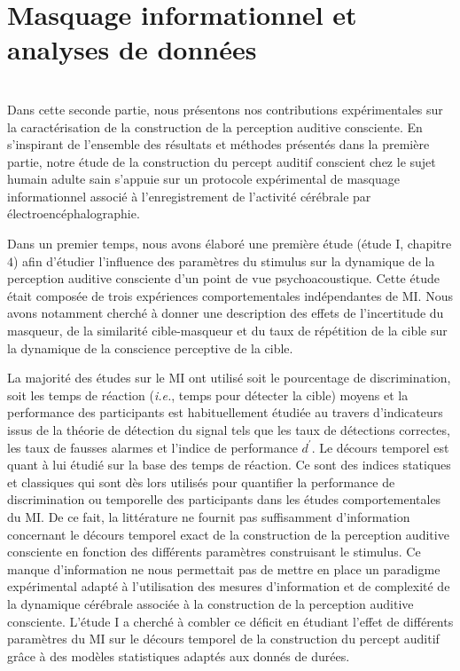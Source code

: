 \chapter{Masquage informationnel et analyses de données}
\label{chapitre3}
\noindent \hrulefill \\

Dans cette seconde partie, nous présentons nos contributions expérimentales sur la caractérisation de la construction de la perception auditive consciente. 
En s'inspirant de l'ensemble des résultats et méthodes présentés dans la première partie, notre étude de la construction du percept auditif conscient chez le sujet humain adulte sain s'appuie sur un protocole expérimental de masquage informationnel associé à l'enregistrement de l'activité cérébrale par électroencéphalographie. 

Dans un premier temps, nous avons élaboré une première étude (étude I, chapitre $4$) afin d'étudier l'influence des paramètres du stimulus sur la dynamique de la perception auditive consciente d'un point de vue psychoacoustique. 
Cette étude était composée de trois expériences comportementales indépendantes de MI. 
Nous avons notamment cherché à donner une description des effets de l'incertitude du masqueur, de la similarité cible-masqueur et du taux de répétition de la cible sur la dynamique de la conscience perceptive de la cible.

La majorité des études sur le MI ont utilisé soit le pourcentage de discrimination, soit les temps de réaction (\textit{i.e.}, temps pour détecter la cible) moyens et la performance des participants est habituellement étudiée au travers d'indicateurs issus de la théorie de détection du signal tels que les taux de détections correctes, les taux de fausses alarmes et l'indice de performance $d^\prime$. 
Le décours temporel est quant à lui étudié sur la base des temps de réaction. 
Ce sont des indices statiques et classiques qui sont dès lors utilisés pour quantifier la performance de discrimination ou temporelle des participants dans les études comportementales du MI. 
De ce fait, la littérature ne fournit pas suffisamment d'information concernant le décours temporel exact de la construction de la perception auditive consciente en fonction des différents paramètres construisant le stimulus. 
Ce manque d'information ne nous permettait pas de mettre en place un paradigme expérimental adapté à l'utilisation des mesures d'information et de complexité de la dynamique cérébrale associée à la construction de la perception auditive consciente. 
L'étude I a cherché à combler ce déficit en étudiant l'effet de différents paramètres du MI sur le décours temporel de la construction du percept auditif grâce à des modèles statistiques adaptés aux donnés de durées. 

